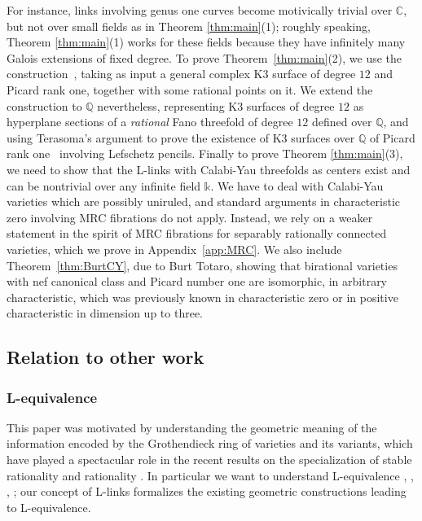 \documentclass[a4paper,12pt]{amsart}
\def\C{\mathbb C}
\def\k{\mathbb k}
\def\Q{\mathbb Q}
\theoremstyle{plain}
\numberwithin{equation}{section}
\theoremstyle{definition}
\renewcommand{\(}{\left(}
\renewcommand{\)}{\right)}
\begin{document}
For instance, links involving genus one curves 
become motivically trivial over $\C$, 
but not over
small fields as 
in Theorem \ref{thm:main}(1);
roughly speaking, 
Theorem \ref{thm:main}(1) 
works for these fields
because they have infinitely many
Galois extensions of fixed degree.
To prove Theorem~\ref{thm:main}(2),
we use the construction~\cite{HassettLai},
taking as input a general complex
K3 surface of degree $12$ and
Picard rank one, 
together with some rational points on it.
We extend the construction to $\Q$ nevertheless,
representing K3 surfaces
of degree $12$ 
as hyperplane sections of
a \emph{rational} Fano threefold of degree $12$
defined over $\Q$,
and using Terasoma's argument to prove the existence of K3 surfaces
over $\Q$ of Picard rank one~\cite{Terasoma}
involving Lefschetz pencils.
Finally to prove Theorem \ref{thm:main}(3),
we need to show that the L-links with Calabi-Yau threefolds as centers \cite{IMOUG2}
exist and
can be nontrivial
over any infinite field $\k$.
We have to deal with 
Calabi-Yau varieties 
which are possibly uniruled, and
standard arguments in characteristic zero involving MRC fibrations
do not apply. Instead, we rely on
a weaker statement in the spirit of MRC fibrations
for separably rationally connected varieties,
which we prove in Appendix~\ref{app:MRC}.
We also include
Theorem~\ref{thm:BurtCY},
due to Burt Totaro, showing that
birational
varieties with nef canonical class and 
Picard number
one are isomorphic, in arbitrary
characteristic, which was previously
known in characteristic zero or in positive characteristic in dimension up to three.



\subsection{Relation to other work}

\subsubsection{L-equivalence} 
\hfill

This paper was motivated by 
understanding the geometric meaning
of the information encoded by the Grothendieck ring of varieties and
its variants,
which have played a spectacular role in the recent
results on the specialization of stable rationality \cite{NicaiseShinder} and rationality \cite{KontsevichTschinkel}.
In particular 
we want to understand
L-equivalence \cite{Borisov}, \cite{HassettLai},
\cite{KuznetsovShinder}, \cite{IMOUG2}; our concept of L-links
formalizes the existing geometric constructions leading to L-equivalence.
\end{document}

